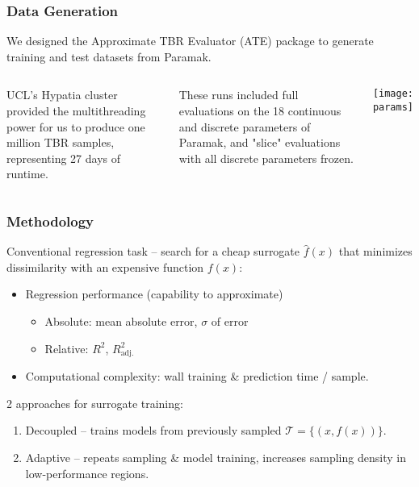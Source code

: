 \begin{frame}
	\frametitle{Data Generation}
	We designed the Approximate TBR Evaluator (ATE) package to generate training and test datasets from Paramak.\newline
	 \begin{columns}[onlytextwidth,T]
      \column{\dimexpr\linewidth-6cm-5mm}
        
        UCL's Hypatia cluster provided the multithreading power for us to produce one million TBR samples, representing 27 days of runtime.\newline
        
        These runs included full evaluations on the 18 continuous and discrete parameters of Paramak, and "slice" evaluations with all discrete parameters frozen.

      \column{6cm}
      \vspace{0cm}
      \texttt{[image: params]}

    \end{columns}
\end{frame}


\begin{frame}
	\frametitle{Methodology}
			Conventional regression task -- search for a cheap surrogate $\hat{f}(x)$ that
			minimizes dissimilarity with an expensive function $f(x)$:

			\begin{itemize}
				\item
					Regression performance (capability to approximate)
					\begin{itemize}
						\item Absolute: mean absolute error, $\sigma$ of error
						\item Relative: $R^2$, $R^2_\text{adj.}$
					\end{itemize}
				\item
					Computational complexity:
					wall training \& prediction time / sample.
			\end{itemize}

			2 approaches for surrogate training:
			\begin{enumerate}
				\item
					Decoupled -- trains models from previously sampled
					$\mathcal{T}=\{(x,f(x))\}$.
				\item
					Adaptive -- repeats sampling \& model training, increases
					sampling density in low-performance regions.
			\end{enumerate}
\end{frame}

